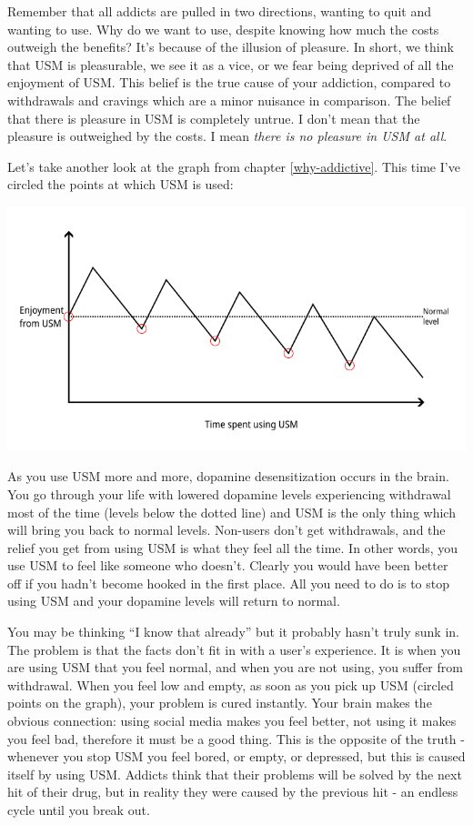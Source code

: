 \documentclass[
  openany]{book}
\begin{document}
Remember that all addicts are pulled in two directions, wanting to quit and wanting to use. Why do we want to use, despite knowing how much the costs outweigh the benefits? It's because of the illusion of pleasure. In short, we think that USM is pleasurable, we see it as a vice, or we fear being deprived of all the enjoyment of USM. This belief is the true cause of your addiction, compared to withdrawals and cravings which are a minor nuisance in comparison. The belief that there is pleasure in USM is completely untrue. I don't mean that the pleasure is outweighed by the costs. I mean \emph{there is no pleasure in USM at all}.

Let's take another look at the graph from chapter \ref{why-addictive}. This time I've circled the points at which USM is used:

\includegraphics[width=0.9\linewidth,height=\textheight,keepaspectratio]{images/dopamine_graph_circlepoints.png}

As you use USM more and more, dopamine desensitization occurs in the brain. You go through your life with lowered dopamine levels experiencing withdrawal most of the time (levels below the dotted line) and USM is the only thing which will bring you back to normal levels. Non-users don't get withdrawals, and the relief you get from using USM is what they feel all the time. In other words, you use USM to feel like someone who doesn't. Clearly you would have been better off if you hadn't become hooked in the first place. All you need to do is to stop using USM and your dopamine levels will return to normal.

You may be thinking ``I know that already'' but it probably hasn't truly sunk in. The problem is that the facts don't fit in with a user's experience. It is when you are using USM that you feel normal, and when you are not using, you suffer from withdrawal. When you feel low and empty, as soon as you pick up USM (circled points on the graph), your problem is cured instantly. Your brain makes the obvious connection: using social media makes you feel better, not using it makes you feel bad, therefore it must be a good thing. This is the opposite of the truth - whenever you stop USM you feel bored, or empty, or depressed, but this is caused itself by using USM. Addicts think that their problems will be solved by the next hit of their drug, but in reality they were caused by the previous hit - an endless cycle until you break out.
\end{document}
